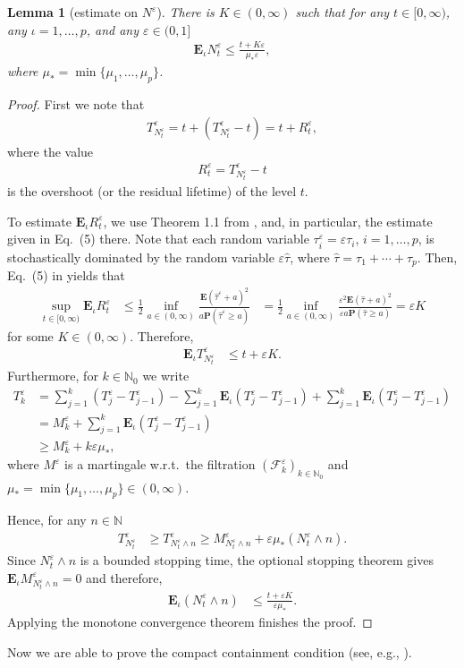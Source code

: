\documentclass[10pt]{article}
\newcommand{\E}{\mathbf{E}}
\renewcommand{\P}{\mathbf{P}}
\newcommand{\1}{1\!\!\!\;{\rm I}}
\theoremstyle{plain}
\newtheorem{lem}[thm]{Lemma}
\theoremstyle{definition}
\newcommand{\e}{\varepsilon}
\newcommand{\ba}{\begin{equation}\begin{aligned}}
\newcommand{\ea}{\end{aligned}\end{equation}}
\newcommand{\rF}{\mathscr{F}}
\newcommand{\bN}{\mathbb{N}}
\numberwithin{equation}{section}
\begin{document}
\begin{lem}[estimate on $N^\e$]
\label{l:Etnu}
There is $K\in (0,\infty)$ such that for any $t\in[0,\infty)$, any $\iota=1,\dots, p$, and any $\e\in(0,1]$
\ba
\E_\iota N^\e_t\leq \frac{t+K\e}{\mu_* \e},
\ea
where $\mu_*=\min\{\mu_1,\dots,\mu_p\}$.
\end{lem}
\begin{proof}
First we note that
\ba
T^\e_{N^\e_t} =t + ( T^\e_{N^\e_t}- t)
=t + R^\e_t,
\ea
where the value
\ba
R^\e_t=T^\e_{N_t^\e}-t
\ea
is the overshoot (or the residual lifetime) of the level $t$.

To estimate $\E_\iota R^\e_t$, we use Theorem 1.1 from \cite{spouge2007inequalities}, and,
in particular, the estimate given in Eq.\ (5) there.
Note that each random variable $\tau^\e_i=\e\tau_i$, $i=1,\dots, p$, is
stochastically dominated by the random variable $\e\widehat \tau$, where
$\widehat \tau=\tau_1+\cdots+\tau_{p}$.
Then, Eq.\ (5) in \cite{spouge2007inequalities} yields that
\ba
\label{e:R}
\sup_{t\in[0,\infty)}\E_\iota R^\e_t &\leq \frac12 \inf_{a\in(0,\infty)}\frac{\E (\widehat \tau^\e + a)^2}{a \P(\widehat \tau^\e\geq a) }
&=\frac12 \inf_{a\in(0,\infty)}\frac{\e^2 \E (\widehat \tau + a)^2}{\e a \P(\widehat \tau \geq a) }
=\e K
\ea
for some $K\in(0,\infty)$.
Therefore,
\ba
\E_\iota T^\e_{N^\e_t} &\leq t + \e K.
\ea
Furthermore, for $k\in\mathbb N_0$ we write
\ba
T_k^\e &= \sum_{j=1}^k (T_j^\e - T_{j-1}^\e) - \sum_{j=1}^k \E_\iota (T_j^\e - T_{j-1}^\e) + \sum_{j=1}^k \E_\iota (T_j^\e - T_{j-1}^\e) \\
&= M_k^\e + \sum_{j=1}^k \E_\iota (T_j^\e - T_{j-1}^\e) \\
&\geq  M_k^\e + k \e \mu_*,
\ea
where $M^\e$ is a martingale w.r.t.\ the filtration $(\rF_k^\e)_{k\in\mathbb N_0}$
and $\mu_*=\min\{\mu_1,\dots,\mu_p\}\in (0,\infty)$.

Hence, for any $n\in\bN$
\ba
T_{N_t^\e}^\e
&\geq T_{N_t^\e\wedge n}^\e \geq  M_{N_t^\e\wedge n}^\e +\e\mu_* (N_t^\e\wedge n).
\ea
Since $N_t^\e\wedge n$ is a bounded stopping time, the optional stopping theorem gives
$\E_\iota M_{N_t^\e\wedge n}^\e=0$
and therefore,
\ba
\E_\iota (N_t^\e\wedge n) & \leq \frac{t  +\e K}{\e \mu_*}.
\ea
Applying the monotone convergence theorem finishes the proof.
\end{proof}


Now we are able to prove the compact containment condition (see, e.g., \cite[Chapter 3, Theorem 9.1]{EthierK-86}).
\end{document}
